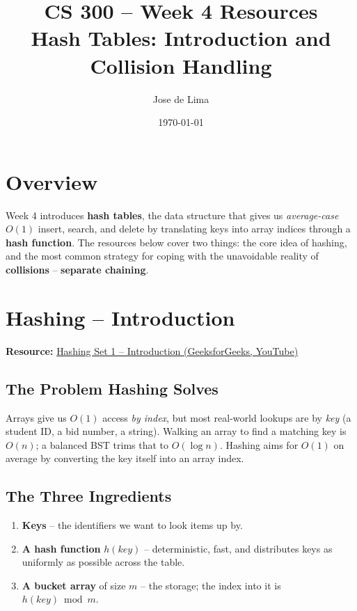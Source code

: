 \documentclass[11pt]{article}
\title{CS 300 -- Week 4 Resources\\\large Hash Tables: Introduction and Collision Handling}
\author{Jose de Lima}
\date{\today}
\begin{document}
\maketitle

\section*{Overview}
Week 4 introduces \textbf{hash tables}, the data structure that gives us
\emph{average-case} $O(1)$ insert, search, and delete by translating keys
into array indices through a \textbf{hash function}. The resources below
cover two things: the core idea of hashing, and the most common strategy
for coping with the unavoidable reality of \textbf{collisions} --
\textbf{separate chaining}.

\section{Hashing -- Introduction}
\textbf{Resource:} \href{https://www.youtube.com/watch?v=wWgIAphfn2U}{Hashing Set 1 -- Introduction (GeeksforGeeks, YouTube)}

\subsection*{The Problem Hashing Solves}
Arrays give us $O(1)$ access \emph{by index}, but most real-world lookups
are by \emph{key} (a student ID, a bid number, a string). Walking an array
to find a matching key is $O(n)$; a balanced BST trims that to
$O(\log n)$. Hashing aims for $O(1)$ on average by converting the key
itself into an array index.

\subsection*{The Three Ingredients}
\begin{enumerate}[leftmargin=*]
    \item \textbf{Keys} -- the identifiers we want to look items up by.
    \item \textbf{A hash function} $h(key)$ -- deterministic, fast, and
          distributes keys as uniformly as possible across the table.
    \item \textbf{A bucket array} of size $m$ -- the storage; the index into
          it is $h(key) \bmod m$.
    \end{enumerate}
\end{document}
